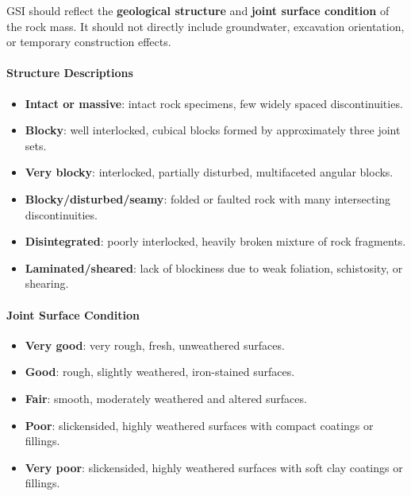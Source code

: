 \begin{keybox}
GSI should reflect the \textbf{geological structure} and \textbf{joint surface condition} of
the rock mass. It should not directly include groundwater, excavation orientation, or
temporary construction effects.
\end{keybox}

\paragraph{Structure Descriptions}

\begin{itemize}
 \item \textbf{Intact or massive}: intact rock specimens, few widely spaced discontinuities.
 \item \textbf{Blocky}: well interlocked, cubical blocks formed by approximately three joint sets.
 \item \textbf{Very blocky}: interlocked, partially disturbed, multifaceted angular blocks.
 \item \textbf{Blocky/disturbed/seamy}: folded or faulted rock with many intersecting discontinuities.
 \item \textbf{Disintegrated}: poorly interlocked, heavily broken mixture of rock fragments.
 \item \textbf{Laminated/sheared}: lack of blockiness due to weak foliation, schistosity, or shearing.
\end{itemize}

\paragraph{Joint Surface Condition}

\begin{itemize}
 \item \textbf{Very good}: very rough, fresh, unweathered surfaces.
 \item \textbf{Good}: rough, slightly weathered, iron-stained surfaces.
 \item \textbf{Fair}: smooth, moderately weathered and altered surfaces.
 \item \textbf{Poor}: slickensided, highly weathered surfaces with compact coatings or fillings.
 \item \textbf{Very poor}: slickensided, highly weathered surfaces with soft clay coatings or fillings.
\end{itemize}

